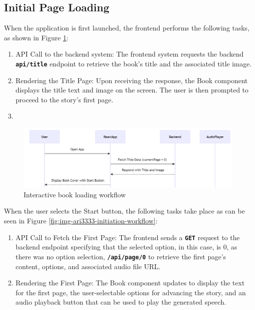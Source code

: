 \documentclass[conference]{IEEEtran}
\begin{document}
	\subsection{Initial Page Loading}
	
	When the application is first launched, the frontend performs the following tasks, as shown in Figure \ref{fig:img-ari3333-loading-workflow}:
	
	\begin{enumerate}[]
		\item API Call to the backend system: The frontend system requests the backend \textbf{\texttt{api/title}} endpoint to retrieve the book's title and the associated title image.
		\item Rendering the Title Page: Upon receiving the response, the Book component displays the title text and image on the screen. The user is then prompted to proceed to the story's first page.
	\item \end{enumerate}
	
	\begin{figure}[H]
		\centering
		\includegraphics[width=0.9\linewidth]{img/img-ARI3333-loading-workflow}
		\caption{Interactive book loading workflow}
		\label{fig:img-ari3333-loading-workflow}
	\end{figure}
	
	When the user selects the Start button, the following tasks take place as can be seen in Figure \ref{fig:img-ari3333-initiation-workflow}:
	
	\begin{enumerate}[]
		\item API Call to Fetch the First Page: The frontend sends a \textbf{\texttt{GET}} request to the backend endpoint specifying that the selected option, in this case, is 0, as there was no option selection, \textbf{\texttt{/api/page/0}} to retrieve the first page's content, options, and associated audio file URL.
		\item Rendering the First Page: The Book component updates to display the text for the first page, the user-selectable options for advancing the story, and an audio playback button that can be used to play the generated speech.
	\end{enumerate}
	
\end{document}

